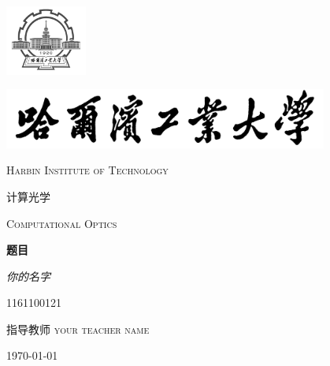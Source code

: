 \documentclass[12pt,a4paper]{report}
\begin{document}
	\begin{titlepage}
		\centering
		\includegraphics[width=0.2\textwidth]{sf1.png}\par
		\vspace{1cm}
		\includegraphics[width=0.8\textwidth]{sf.jpg}\par
		\vspace{0.1cm}
		{\scshape\LARGE Harbin Institute of Technology \par}
		\vspace{1cm}
		{\kaishu\LARGE 计算光学\par}
		{\scshape\LARGE Computational Optics \par}
		\vspace{1.5cm}
		{\Huge\bfseries 题目\par}
		
		\vspace{2cm}
		{\fangsong\Large\itshape 你的名字\par}
		\vfill
		\large{1161100121}\par
		\large{}
		
		\vfill
		指导教师	\textsc{your teacher name}
		\vfill
		{\large \today\par}
	\end{titlepage}
	\tableofcontents
	
	
	
\end{document}
